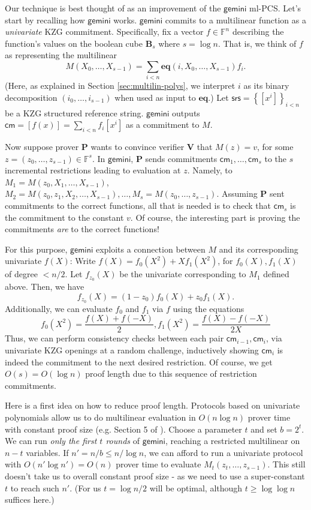 \documentclass[11pt]{article} %
\newcommand{\gemini}{\ensuremath{\mathsf{gemini}}\xspace}
\newcommand{\F}{\ensuremath{\mathbb F}\xspace}
\newcommand{\srs}{\ensuremath{\mathsf{srs}}\xspace}
\newcommand{\cm}{\ensuremath{\mathsf{cm}}\xspace}
\newcommand{\sett}[2]{\ensuremath{\set{#1}_{#2}}\xspace}
\newcommand{\enc}[1]{\ensuremath{\left[#1\right]}\xspace}
\newcommand{\prv}{\ensuremath{\mathsf{\mathbf{P}}}\xspace}
\newcommand{\ver}{\ensuremath{\mathsf{\mathbf{V}}}\xspace}
\newcommand{\set}[1]{\ensuremath{\left\{#1\right\}}\xspace}
\newcommand{\sumi}[1]{\sum_{i< #1}}
\newcommand{\eq}{\ensuremath{\mathsf{eq}}\xspace}
\renewcommand{\eq}{\ensuremath{\mathbf{eq}}\xspace}
\newcommand{\B}[1]{\ensuremath{\mathbf{B}_{#1}}\xspace}
\newcommand{\mlpcs}{ml-PCS\xspace}
\begin{document}
Our technique is best thought of as an improvement of the \gemini \mlpcs\cite{gemini}.
Let's start by recalling how \gemini works.
\gemini commits to a multilinear function as a \emph{univariate} KZG commitment\cite{kzg}. Specifically,
fix a vector $f\in \F^n$ describing the function's values on the boolean cube \B{s} where $s=\log n$. That is, we think of $f$ as representing the 
multilinear
\[M(X_0,\ldots,X_{s-1})= \sumi{n}\eq(i,X_0,\ldots,X_{s-1}) f_i.\]
(Here, as explained in Section \ref{sec:multilin-polys}, we interpret $i$ as its binary decomposition $(i_0,\ldots,i_{s-1})$
when used as input to \eq.)
Let $\srs =\sett{\enc{x^i}}{i<n}$be a KZG structured reference string.
 \gemini outputs $\cm=\enc{f(x)}=\sumi{n}f_i \enc{x^i}$ as a commitment to $M$.  


Now suppose prover \prv wants to convince verifier \ver  that $M(z)=v$, for some $z=(z_0,\ldots,z_{s-1})\in \F^s$. In \gemini, \prv sends commitments $\cm_1,\ldots,\cm_s$ to the $s$ incremental restrictions leading  to evaluation at $z$.
Namely, to $M_1=M(z_0,X_1,\ldots,X_{s-1})$, $M_2=M(z_0,z_1,X_2,\ldots,X_{s-1}),\ldots,M_s=M(z_0,\ldots,z_{s-1})$.
Assuming \prv sent commitments to the correct functions, all that is needed is to check that $\cm_s$ is the commitment to the constant $v$. Of course, the interesting part is proving the commitments \emph{are} to the correct functions!

For this purpose, \gemini exploits a connection between $M$ and its corresponding univariate $f(X)$:
Write $f(X)=f_0(X^2)+X f_1(X^2)$, for $f_0(X),f_1(X)$ of degree $<n/2$. Let $f_{z_0}(X)$ be the univariate corresponding to $M_1$ defined above. Then, we have
\[f_{z_0}(X)=(1-z_0)f_0(X)+ z_0 f_1(X).\]
Additionally, we can evaluate $f_0$ and $f_1$ via $f$  using the equations
\[f_0(X^2)=\frac{f(X)+f(-X)}{2}, f_1(X^2)=\frac{f(X)-f(-X)}{2X}\]
Thus, we can perform consistency checks between each pair $\cm_{i-1},\cm_i$, via univariate KZG openings at a random challenge, inductively showing $\cm_i$ is indeed the commitment to the next desired restriction.
Of course, we get $O(s)=O(\log n)$ proof length due to this sequence of restriction commitments.

Here is a first idea on how to reduce proof length.
Protocols based on univariate polynomials allow us to do multilinear evaluation in $O(n\log n)$ prover time with constant proof size (e.g. Section 5 of \cite{logupgkr}).
Choose a parameter $t$ and set $b=2^t$.
We can run \emph{only the first $t$ rounds} of \gemini, reaching a restricted multilinear on $n-t$ variables.
If $n'=n/b\leq n/\log n$, we can afford to run a univariate protocol with $O(n' \log n')=O(n)$ prover time to evaluate $M_t(z_t,\ldots,z_{s-1})$.
This still doesn't take us to overall constant proof size - as we  need to use a super-constant $t$ to reach such $n'$. (For us $t=\log n/2$ will be optimal, although $t\geq \log \log n$ suffices here.)
\end{document}
